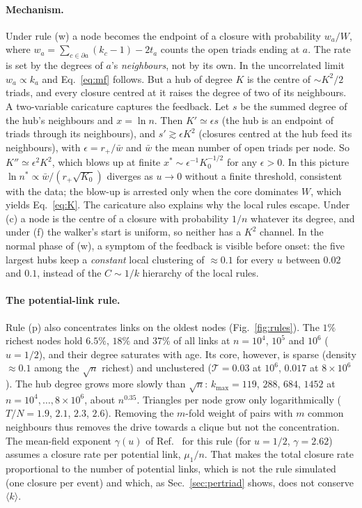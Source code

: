 \documentclass[aps,pre,twocolumn,superscriptaddress,floatfix,nofootinbib]{revtex4-2}
\begin{document}
\paragraph*{Mechanism.}
Under rule (w) a node becomes the endpoint of a closure with probability
$w_a/W$, where $w_a=\sum_{c\in\partial a}(k_c-1)-2t_a$ counts the open triads
ending at $a$. The rate is set by the degrees of $a$'s \emph{neighbours}, not
by its own. In the uncorrelated limit $w_a\propto k_a$ and Eq.~\eqref{eq:mf}
follows. But a hub of degree $K$ is the centre of $\sim K^2/2$ triads, and
every closure centred at it raises the degree of two of its neighbours. A
two-variable caricature captures the feedback. Let $s$ be the summed degree of
the hub's neighbours and $x=\ln n$. Then $K'\simeq\epsilon s$ (the hub is an
endpoint of triads through its neighbours), and $s'\gtrsim\epsilon K^2$ (closures
centred at the hub feed its neighbours), with $\epsilon=r_+/\bar w$ and $\bar w$
the mean number of open triads per node. So $K''\simeq\epsilon^2K^2$, which blows
up at finite $x^*\sim\epsilon^{-1}K_0^{-1/2}$ for any $\epsilon>0$. In this
picture $\ln n^*\propto\bar w/(r_+\sqrt{K_0})$ diverges as $u\to0$ without a finite
threshold, consistent with the data; the blow-up is arrested only when the core
dominates $W$, which yields Eq.~\eqref{eq:K}. The caricature also explains why
the local rules escape. Under (c) a node is the centre of a closure with
probability $1/n$ whatever its degree, and under (f) the walker's start is
uniform, so neither has a $K^2$ channel. In the normal phase of (w), a symptom
of the feedback is visible before onset: the five largest hubs keep a
\emph{constant} local clustering of $\approx0.1$ for every $u$ between $0.02$
and $0.1$, instead of the $C\sim1/k$ hierarchy of the local rules.

\paragraph*{The potential-link rule.}
Rule (p) also concentrates links on the oldest nodes
(Fig.~\ref{fig:rules}). The $1\%$ richest nodes hold $6.5\%$, $18\%$ and $37\%$
of all links at $n=10^4$, $10^5$ and $10^6$ ($u=1/2$), and their degree
saturates with age. Its core, however, is sparse (density $\approx0.1$ among
the $\sqrt n$ richest) and unclustered ($\mathcal T=0.03$ at $10^6$, $0.017$ at $8\times10^6$). The hub
degree grows more slowly than $\sqrt n$: $k_{\max}=119$, $288$, $684$, $1452$ at
$n=10^4,\dots,8\times10^6$, about $n^{0.35}$. Triangles per node grow only
logarithmically ($T/N=1.9$, $2.1$, $2.3$, $2.6$). Removing the $m$-fold weight of
pairs with $m$ common neighbours thus removes the drive towards a clique but
not the concentration. The mean-field exponent $\gamma(u)$ of Ref.~\cite{book}
for this rule (for $u=1/2$, $\gamma=2.62$) assumes a closure rate per potential
link, $\mu_1/n$. That makes the total closure rate proportional to the number
of potential links, which is not the rule simulated (one closure per event) and
which, as Sec.~\ref{sec:pertriad} shows, does not conserve $\langle k\rangle$.
\end{document}
